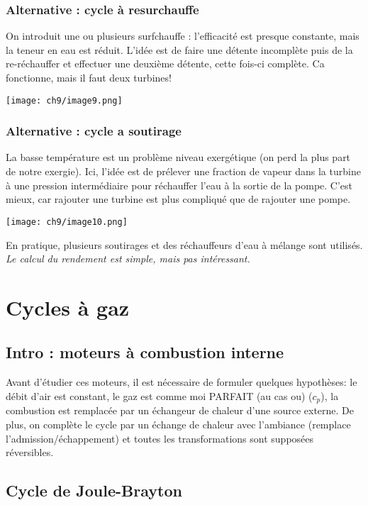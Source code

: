 		\subsubsection{Alternative : cycle à resurchauffe}
		On introduit une ou plusieurs surfchauffe : l'efficacité est presque 
		constante, mais la teneur en eau est réduit. L'idée est de faire une 
		détente incomplète puis de la re-réchauffer et effectuer une deuxième 
		détente, cette fois-ci complète. Ca fonctionne, mais il faut deux 
		turbines!
		\begin{center}
				\texttt{[image: ch9/image9.png]}
		\end{center}
	
		\subsubsection{Alternative : cycle a soutirage}
		La basse température est un problème niveau exergétique (on perd la plus 
		part de notre exergie). Ici, l'idée est de prélever une fraction de vapeur 
		dans la turbine à une pression intermédiaire pour réchauffer l'eau à la sortie 
		de la pompe. C'est mieux, car rajouter une turbine est plus compliqué 
		que de rajouter une pompe.
				\begin{center}
				\texttt{[image: ch9/image10.png]}
		\end{center}
		En pratique, plusieurs soutirages et des réchauffeurs d’eau à mélange
		sont utilisés. \textit{Le calcul du rendement est simple, mais pas intéressant.}
		
		
\newpage
\section{Cycles à gaz}
	\subsection{Intro : moteurs à combustion interne}
	Avant d'étudier ces moteurs, il est nécessaire de formuler quelques hypothèses: le 
	débit d'air est constant, le gaz est comme moi PARFAIT (au cas ou) ($c_p$), la combustion est remplacée 
	par un échangeur de chaleur d'une source externe. De plus, on complète le cycle par 
	un échange de chaleur avec l'ambiance (remplace l'admission/échappement) et toutes 
	les transformations sont supposées réversibles.
	
	\subsection{Cycle de Joule-Brayton}
